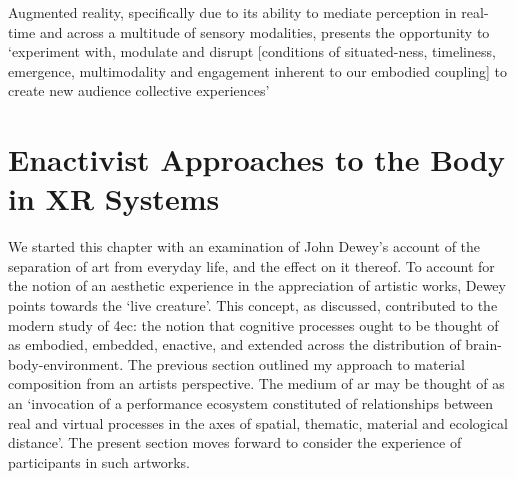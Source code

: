 Augmented reality, specifically due to its ability to mediate perception in real-time and across a multitude of sensory modalities, presents the opportunity to `experiment with, modulate and disrupt [conditions of situated-ness, timeliness, emergence, multimodality and engagement inherent to our embodied coupling] to create new audience collective experiences' \citep[]{chevalier2018}



\section{Enactivist Approaches to the Body in XR Systems}\label{sec: theory-embodiment}
We started this chapter with an examination of John Dewey's account of the separation of art from everyday life, and the effect on it thereof. To account for the notion of an aesthetic experience in the appreciation of artistic works, Dewey points towards the `live creature'. This concept, as discussed, contributed to the modern study of \gls{4ec}: the notion that cognitive processes ought to be thought of as embodied, embedded, enactive, and extended across the distribution of brain-body-environment. The previous section outlined my approach to material composition from an artists perspective. The medium of \gls{ar} may be thought of as an `invocation of a performance ecosystem constituted of relationships between real and virtual processes in the axes of spatial, thematic, material and ecological distance'. The present section moves forward to consider the experience of participants in such artworks.

